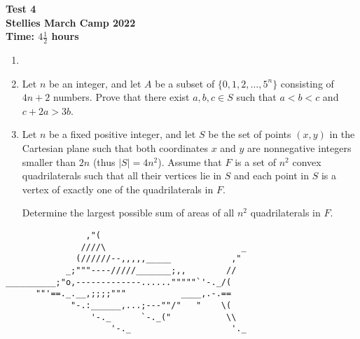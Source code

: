 \documentclass{article}
\begin{document}
\thispagestyle{empty}

\begin{center}
  \textbf{\Large Test 4}
  \\ \vspace{1em}
  \textbf{\large Stellies March Camp 2022}
  \\ \vspace{1em}
  \textbf{\large Time: $4\frac{1}{2}$ hours}
\end{center}

\vspace{24pt}

\begin{enumerate}[itemsep=12pt]

\item %


\item %
Let $n$ be an integer, and let $A$ be a subset of $\{0, 1, 2, \dotsc, 5^n\}$ consisting of $4n+2$ numbers.
Prove that there exist $a, b, c \in S$ such that $a < b < c$ and $c +2a > 3b$.

\item %
Let $n$ be a fixed positive integer, and let $S$ be the set of points $(x,y)$ in the Cartesian plane such that both coordinates $x$ and $y$ are nonnegative integers smaller than $2n$ (thus $|S| = 4n^2$).
Assume that $F$ is a set of $n^2$ convex quadrilaterals such that all their vertices lie in $S$ and each point in $S$ is a vertex of exactly one of the quadrilaterals in $F$.

Determine the largest possible sum of areas of all $n^2$ quadrilaterals in $F$.

\end{enumerate}

\vfill
\centering
\begin{BVerbatim}
                ,"(
               ////\                           _
              (//////--,,,,,_____            ,"
            _;"""----/////_______;,,        //
__________;"o,-------------......"""""`'-._/(
      ""'==._.__,;;;;"""           ____,.-.==
             "-.:______,...;---""/"   "    \(
                 '-._      `-._("           \\
                     '-._                    '._
\end{BVerbatim}
\end{document}
